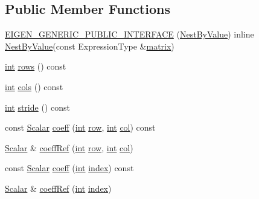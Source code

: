 \subsection*{Public Member Functions}
\begin{DoxyCompactItemize}
\item 
\hyperlink{class_nest_by_value_a54c508cb9e78783f9676d0d5f1fe69af}{E\-I\-G\-E\-N\-\_\-\-G\-E\-N\-E\-R\-I\-C\-\_\-\-P\-U\-B\-L\-I\-C\-\_\-\-I\-N\-T\-E\-R\-F\-A\-C\-E} (\hyperlink{class_nest_by_value}{Nest\-By\-Value}) inline \hyperlink{class_nest_by_value}{Nest\-By\-Value}(const Expression\-Type \&\hyperlink{glext_8h_a7b24a3f2f56eb1244ae69dacb4fecb6f}{matrix})
\item 
\hyperlink{ioapi_8h_a787fa3cf048117ba7123753c1e74fcd6}{int} \hyperlink{class_nest_by_value_a02fa7f14417d274b121ed021e3ed98be}{rows} () const 
\item 
\hyperlink{ioapi_8h_a787fa3cf048117ba7123753c1e74fcd6}{int} \hyperlink{class_nest_by_value_a472ca1a4b4e25ad32ea1717d1168783b}{cols} () const 
\item 
\hyperlink{ioapi_8h_a787fa3cf048117ba7123753c1e74fcd6}{int} \hyperlink{class_nest_by_value_ac829cf60b2466efe30211df1ceab1172}{stride} () const 
\item 
const \hyperlink{class_matrix_base_a625df8339dc2d816cbc0fd66e7dadaf5}{Scalar} \hyperlink{class_nest_by_value_a3c647aba02fbc587b992120328cf6c2e}{coeff} (\hyperlink{ioapi_8h_a787fa3cf048117ba7123753c1e74fcd6}{int} \hyperlink{glext_8h_a11b277b422822f784ee248b43eee3e1e}{row}, \hyperlink{ioapi_8h_a787fa3cf048117ba7123753c1e74fcd6}{int} \hyperlink{class_matrix_base_ae3c94b0f25b4273c7a8125169bdf60e0}{col}) const 
\item 
\hyperlink{class_matrix_base_a625df8339dc2d816cbc0fd66e7dadaf5}{Scalar} \& \hyperlink{class_nest_by_value_a1132f0a2e12ca386fbd106577c9e66db}{coeff\-Ref} (\hyperlink{ioapi_8h_a787fa3cf048117ba7123753c1e74fcd6}{int} \hyperlink{glext_8h_a11b277b422822f784ee248b43eee3e1e}{row}, \hyperlink{ioapi_8h_a787fa3cf048117ba7123753c1e74fcd6}{int} \hyperlink{class_matrix_base_ae3c94b0f25b4273c7a8125169bdf60e0}{col})
\item 
const \hyperlink{class_matrix_base_a625df8339dc2d816cbc0fd66e7dadaf5}{Scalar} \hyperlink{class_nest_by_value_a464980ba04e72c08625d0769556f5336}{coeff} (\hyperlink{ioapi_8h_a787fa3cf048117ba7123753c1e74fcd6}{int} \hyperlink{glext_8h_ab47dd9958bcadea08866b42bf358e95e}{index}) const 
\item 
\hyperlink{class_matrix_base_a625df8339dc2d816cbc0fd66e7dadaf5}{Scalar} \& \hyperlink{class_nest_by_value_a38fc06a728f8fd9b15f32d665f1baea4}{coeff\-Ref} (\hyperlink{ioapi_8h_a787fa3cf048117ba7123753c1e74fcd6}{int} \hyperlink{glext_8h_ab47dd9958bcadea08866b42bf358e95e}{index})

\end{DoxyCompactItemize}
